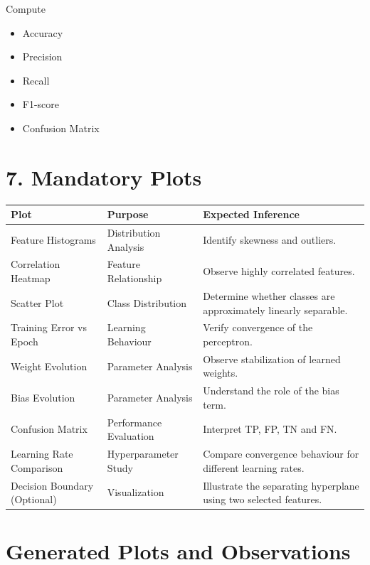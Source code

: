 \documentclass[11pt]{article}
\begin{document}
Compute

\begin{itemize}
\item Accuracy
\item Precision
\item Recall
\item F1-score
\item Confusion Matrix
\end{itemize}


\section*{7. Mandatory Plots}

\begin{longtable}{|p{3.4cm}|p{3.4cm}|p{6cm}|}
\hline
\textbf{Plot} & \textbf{Purpose} & \textbf{Expected Inference}\\
\hline
Feature Histograms & Distribution Analysis & Identify skewness and outliers.\\
\hline
Correlation Heatmap & Feature Relationship & Observe highly correlated features.\\
\hline
Scatter Plot & Class Distribution & Determine whether classes are approximately linearly separable.\\
\hline
Training Error vs Epoch & Learning Behaviour & Verify convergence of the perceptron.\\
\hline
Weight Evolution & Parameter Analysis & Observe stabilization of learned weights.\\
\hline
Bias Evolution & Parameter Analysis & Understand the role of the bias term.\\
\hline
Confusion Matrix & Performance Evaluation & Interpret TP, FP, TN and FN.\\
\hline
Learning Rate Comparison & Hyperparameter Study & Compare convergence behaviour for different learning rates.\\
\hline
Decision Boundary (Optional) & Visualization & Illustrate the separating hyperplane using two selected features.\\
\hline
\end{longtable}

\section*{Generated Plots and Observations}

\end{document}
